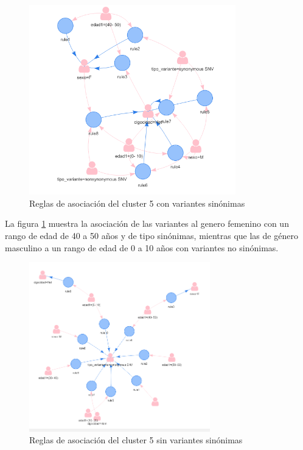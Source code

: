 \begin{figure}[H]
	\centering
	\includegraphics[width=0.8\textwidth]{Kap4/reglas5_1}
	\caption{Reglas de asociación del cluster 5 con variantes sinónimas} \label{fig:r5}
\end{figure}

La figura \ref{fig:r5} muestra la asociación de las variantes al genero femenino con un rango de edad de 40 a 50 años y de tipo sinónimas, mientras que las de género masculino  a un rango de edad de 0 a 10 años con variantes no sinónimas.

\begin{figure}[H]
	\centering
	\includegraphics[width=0.7\textwidth]{Kap4/reglas5_2}
	\caption{Reglas de asociación del cluster 5 sin variantes sinónimas} \label{fig:re5}
\end{figure}

